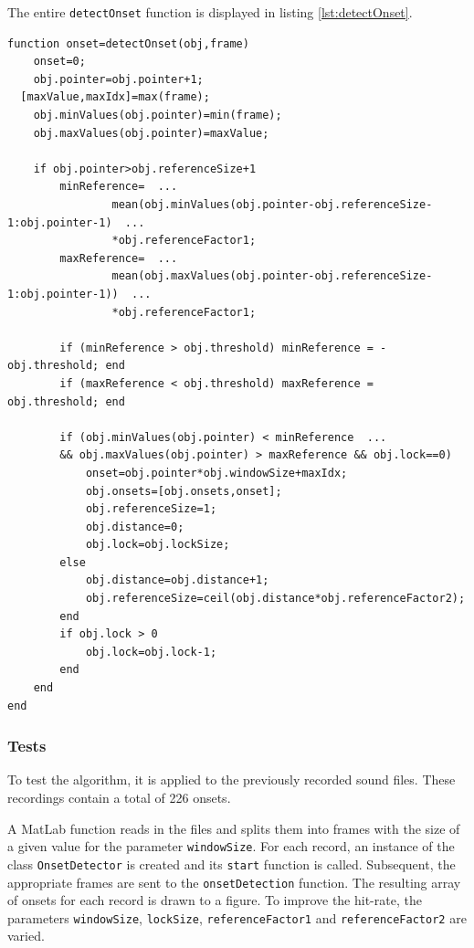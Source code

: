 The entire \lstinline{detectOnset} function is displayed in listing \ref{lst:detectOnset}.

\begin{lstlisting}[caption={detectOnset},label={lst:detectOnset}]
function onset=detectOnset(obj,frame)
	onset=0;
	obj.pointer=obj.pointer+1;
  [maxValue,maxIdx]=max(frame);
	obj.minValues(obj.pointer)=min(frame);
	obj.maxValues(obj.pointer)=maxValue;
	
	if obj.pointer>obj.referenceSize+1 
		minReference=  ...
				mean(obj.minValues(obj.pointer-obj.referenceSize-1:obj.pointer-1)  ...
				*obj.referenceFactor1;
		maxReference=  ...
				mean(obj.maxValues(obj.pointer-obj.referenceSize-1:obj.pointer-1))  ...
				*obj.referenceFactor1;

		if (minReference > obj.threshold) minReference = -obj.threshold; end
		if (maxReference < obj.threshold) maxReference = obj.threshold; end  

		if (obj.minValues(obj.pointer) < minReference  ...
		&& obj.maxValues(obj.pointer) > maxReference && obj.lock==0) 
			onset=obj.pointer*obj.windowSize+maxIdx; 
			obj.onsets=[obj.onsets,onset];
			obj.referenceSize=1;
			obj.distance=0;
			obj.lock=obj.lockSize;
		else
			obj.distance=obj.distance+1;
			obj.referenceSize=ceil(obj.distance*obj.referenceFactor2);
		end
		if obj.lock > 0
			obj.lock=obj.lock-1;
		end            
	end	
end
\end{lstlisting}


\subsubsection{Tests}

To test the algorithm, it is applied to the previously recorded sound files. These recordings contain a total of 226 onsets.

A MatLab function reads in the files and splits them into frames with the size of a given value for the parameter \lstinline{windowSize}. For each record, an instance of the class \lstinline{OnsetDetector} is created and its \lstinline{start} function is called. Subsequent, the appropriate frames are sent to the \lstinline{onsetDetection} function. The resulting array of onsets for each record is drawn to a figure. To improve the hit-rate, the parameters \lstinline{windowSize}, \lstinline{lockSize}, \lstinline{referenceFactor1} and \lstinline{referenceFactor2} are varied. 

